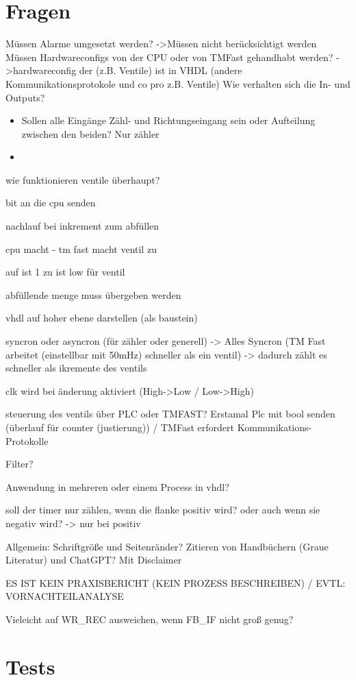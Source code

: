 \chapter{Fragen}
Müssen Alarme umgesetzt werden? ->Müssen nicht berücksichtigt werden
Müssen Hardwareconfigs von der CPU oder von TMFast gehandhabt werden? ->hardwareconfig der (z.B. Ventile) ist in VHDL (andere Kommunikationsprotokole und co pro z.B. Ventile)
Wie verhalten sich die In- und Outputs? 
\begin{itemize}
    \item Sollen alle Eingänge Zähl- und Richtungseingang sein oder Aufteilung zwischen den beiden? Nur zähler
    \item 
\end{itemize}

wie funktionieren ventile überhaupt?

bit an die cpu senden 

nachlauf bei inkrement zum abfüllen

cpu macht  - tm fast macht ventil zu

auf ist 1 zu ist low für ventil

abfüllende menge muss übergeben werden

vhdl auf hoher ebene darstellen (als baustein)

syncron oder asyncron (für zähler oder generell) -> Alles Syncron (TM Fast arbeitet (einstellbar mit 50mHz) schneller als ein ventil) -> dadurch zählt es schneller als ikremente des ventils

clk wird bei änderung aktiviert (High->Low / Low->High)

steuerung des ventils über PLC oder TMFAST? Erstamal Plc mit bool senden (überlauf für counter (justierung)) / TMFast erfordert Kommunikations-Protokolle

Filter?

Anwendung in mehreren oder einem Process in vhdl?

soll der timer nur zählen, wenn die flanke positiv wird? oder auch wenn sie negativ wird? -> nur bei positiv

Allgemein:
Schriftgröße und Seitenränder?
Zitieren von Handbüchern (Graue Literatur) und ChatGPT? Mit Disclaimer

ES IST KEIN PRAXISBERICHT (KEIN PROZESS BESCHREIBEN) / EVTL: VORNACHTEILANALYSE  

Vieleicht auf WR\_REC ausweichen, wenn FB\_IF nicht groß genug?

\chapter{Tests}

